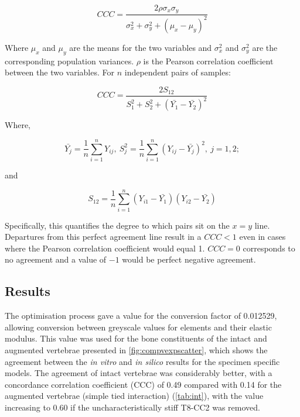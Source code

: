\begin{equation*} CCC = \dfrac{2 \rho \sigma_x \sigma_y}{\sigma_x^2 +
\sigma_y^2 + (\mu_x - \mu_y)^2} 
\end{equation*} 

Where $\mu_x$ and $\mu_y$ are the means for the two variables and $\sigma_x^2$
and $\sigma_y^2$ are the corresponding population variances.  $\rho$ is the
Pearson correlation coefficient between the two variables.  For $n$ independent
pairs of samples:

\begin{equation*} CCC = \dfrac{2S_{12}}{S_1^2 + S_2^2 +
(\bar{Y_1}-\bar{Y_2})^2} 
\end{equation*}

Where, 

\begin{equation*} \bar{Y_j} =
\dfrac{1}{n} \sum_{i=1}^{n} Y_{ij},\ S_j^2 = \dfrac{1}{n} \sum_{i=1}^{n}
(Y_{ij} - \bar{Y_j})^2,\ j = 1, 2; 
\end{equation*}

and

\begin{equation*} S_{12}
    = \dfrac{1}{n} \sum_{i=1}^{n} (Y_{i1} - \bar{Y_1})(Y_{i2} - \bar{Y_2})
\end{equation*}

Specifically, this quantifies the degree to which pairs sit on the $x=y$ line.
Departures from this perfect agreement line result in a $CCC < 1$ even in cases
where the Pearson correlation coefficient would equal 1.  $CCC = 0$ corresponds
to no agreement and a value of $-1$ would be perfect negative agreement.



\subsection{Results} \label{bov:results}

The optimisation process gave a value for the conversion factor of 0.012529,
allowing conversion between greyscale values for elements and their elastic
modulus. This value was used for the bone constituents of the intact and
augmented vertebrae presented in \cref{fig:compvexpscatter}, which shows the
agreement between the \textit{in vitro} and \textit{in silico} results for the
specimen specific models. The agreement of intact vertebrae was considerably
better, with a concordance correlation coefficient (CCC) of 0.49 compared with
0.14 for the augmented vertebrae (simple tied interaction) (\cref{tab:int}),
with the value increasing to 0.60 if the uncharacteristically stiff T8-CC2 was
removed.

